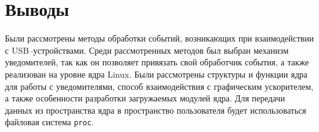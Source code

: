 \newpage
\section*{Выводы}

Были рассмотрены методы обработки событий, возникающих при взаимодействии с USB--устройствами. Среди рассмотренных методов был выбран механизм уведомителей, так как он позволяет привязать свой обработчик события, а также реализован на уровне ядра Linux. Были рассмотрены структуры и функции ядра для работы с уведомителями, способ взаимодействия с графическим ускорителем, а также особенности разработки загружаемых модулей ядра. Для передачи данных из пространства ядра в пространство пользователя будет использоваться файловая система \texttt{proc}.